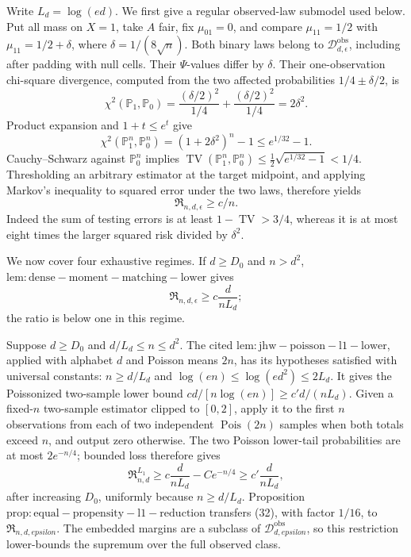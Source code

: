 Write \(L_d=\log(ed)\).  We first give a regular observed-law submodel used below.  Put all mass on \(X=1\), take \(A\) fair, fix \(\mu_{01}=0\), and compare \(\mu_{11}=1/2\) with \(\mu_{11}=1/2+\delta\), where \(\delta=1/(8\sqrt n)\).  Both binary laws belong to \(\mathcal D_{d,\epsilon}^{\mathrm{obs}}\), including after padding with null cells.  Their \(\Psi\)-values differ by \(\delta\).  Their one-observation chi-square divergence, computed from the two affected probabilities \(1/4\pm\delta/2\), is
\[
 \chi^2(\mathbb P_1,\mathbb P_0)
 =\frac{(\delta/2)^2}{1/4}+\frac{(\delta/2)^2}{1/4}=2\delta^2.
\]
Product expansion and \(1+t\leq e^t\) give
\[
 \chi^2(\mathbb P_1^n,\mathbb P_0^n)
 =(1+2\delta^2)^n-1\leq e^{1/32}-1.                                \tag{29}
\]
Cauchy--Schwarz against \(\mathbb P_0^n\) implies \(\operatorname{TV}(\mathbb P_1^n,\mathbb P_0^n)\leq\tfrac12\sqrt{e^{1/32}-1}<1/4\).  Thresholding an arbitrary estimator at the target midpoint, and applying Markov's inequality to squared error under the two laws, therefore yields
\[
 \mathfrak R_{n,d,\epsilon}\geq c/n.                               \tag{30}
\]
Indeed the sum of testing errors is at least \(1-\operatorname{TV}>3/4\), whereas it is at most eight times the larger squared risk divided by \(\delta^2\).

We now cover four exhaustive regimes.  If \(d\geq D_0\) and \(n>d^2\), \(\mathrm{lem:dense-moment-matching-lower}\) gives
\[
 \mathfrak R_{n,d,\epsilon}\geq c\frac d{nL_d};                    \tag{31}
\]
the ratio is below one in this regime.

Suppose \(d\geq D_0\) and \(d/L_d\leq n\leq d^2\).  The cited \(\mathrm{lem:jhw-poisson-l1-lower}\), applied with alphabet \(d\) and Poisson means \(2n\), has its hypotheses satisfied with universal constants: \(n\geq d/L_d\) and \(\log(en)\leq\log(ed^2)\leq2L_d\).  It gives the Poissonized two-sample lower bound \(c d/[n\log(en)]\geq c'd/(nL_d)\).  Given a fixed-\(n\) two-sample estimator clipped to \([0,2]\), apply it to the first \(n\) observations from each of two independent \(\operatorname{Pois}(2n)\) samples when both totals exceed \(n\), and output zero otherwise.  The two Poisson lower-tail probabilities are at most \(2e^{-n/4}\); bounded loss therefore gives
\[
 \mathfrak R^{L_1}_{n,d}\geq c\frac d{nL_d}-Ce^{-n/4}
 \geq c'\frac d{nL_d},                                              \tag{32}
\]
after increasing \(D_0\), uniformly because \(n\geq d/L_d\).  Proposition \(\mathrm{prop:equal-propensity-l1-reduction}\) transfers (32), with factor \(1/16\), to \(\mathfrak R_{n,d,epsilon}\).  The embedded margins are a subclass of \(\mathcal D_{d,epsilon}^{\mathrm{obs}}\), so this restriction lower-bounds the supremum over the full observed class.

